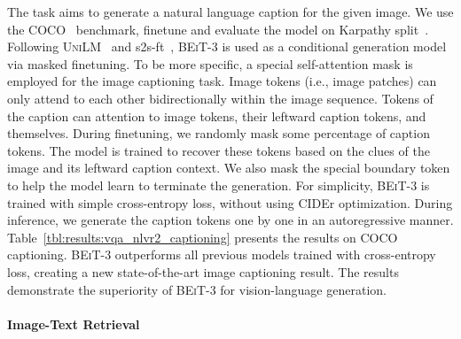 \documentclass{article}
\newcommand\our{\textsc{BEiT-3}}
\begin{document}
The task aims to generate a natural language caption for the given image.
We use the COCO~\citep{coco} benchmark, finetune and evaluate the model on Karpathy split~\citep{karpathysplit}. 
Following \textsc{UniLM}~\citep{unilm} and s2s-ft~\citep{s2s-ft}, \our{} is used as a conditional generation model via masked finetuning.
To be more specific, a special self-attention mask is employed for the image captioning task.
Image tokens (i.e., image patches) can only attend to each other bidirectionally within the image sequence.
Tokens of the caption can attention to image tokens, their leftward caption tokens, and themselves.
During finetuning, we randomly mask some percentage of caption tokens.
The model is trained to recover these tokens based on the clues of the image and its leftward caption context.
We also mask the special boundary token  to help the model learn to terminate the generation.
For simplicity, \our{} is trained with simple cross-entropy loss, without using CIDEr optimization.
During inference, we generate the caption tokens one by one in an autoregressive manner.
Table~\ref{tbl:results:vqa_nlvr2_captioning} presents the results on COCO captioning.
\our{} outperforms all previous models trained with cross-entropy loss, creating a new state-of-the-art image captioning result.
The results demonstrate the superiority of \our{} for vision-language generation.

\paragraph{Image-Text Retrieval}
\end{document}
